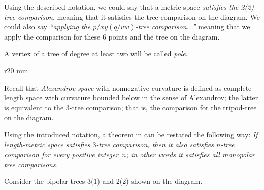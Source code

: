 Using the described notation, we could say that a metric space \emph{satisfies the 2(2)-tree comparison},  meaning that it satisfies the tree comparison on the diagram.
We could also say \emph{``applying the $p/xy(q/vw)$-tree comparison...''} meaning that we apply the comparison for these 6 points and the tree on the diagram.

A vertex of a tree of degree at least two will be called \emph{pole}.

\hide
\begin{wrapfigure}{r}{20 mm}
\end{wrapfigure}
\unhide

Recall that \emph{Alexandrov space} with nonnegative curvature is defined as complete length space with curvature bounded below in the sense of Alexandrov;
the latter is equivalent to the 3-tree comparison; that is, the comparison for the tripod-tree on the diagram. 

Using the introduced notation, a theorem in \cite{AKP} can be restated the following way: \emph{If length-metric space satisfies $3$-tree comparison, then it also satisfies $n$-tree comparison for every positive integer~$n$; in other words it satisfies all monopolar tree comparisons.}

Consider the bipolar trees 3(1) and 2(2) shown on the diagram.

